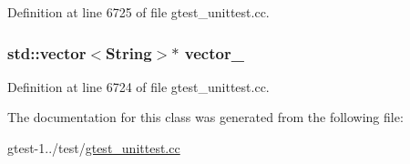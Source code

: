 \-Definition at line 6725 of file gtest\-\_\-unittest.\-cc.

\hypertarget{classSequenceTestingListener_acf67cca6269f360d7f600dc694c9b670}{
\subsubsection[{vector\-\_\-}]{\setlength{\rightskip}{0pt plus 5cm}std\-::vector$<${\bf \-String}$>$$\ast$ {\bf vector\-\_\-}}}\label{d5/d3e/classSequenceTestingListener_acf67cca6269f360d7f600dc694c9b670}


\-Definition at line 6724 of file gtest\-\_\-unittest.\-cc.



\-The documentation for this class was generated from the following file\-:\begin{DoxyCompactItemize}
\item 
gtest-\/1../test/\hyperlink{gtest__unittest_8cc}{gtest\-\_\-unittest.\-cc}\end{DoxyCompactItemize}
